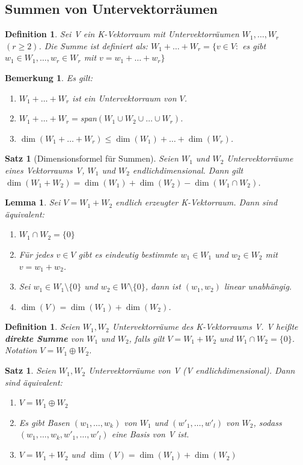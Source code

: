 \documentclass[12pt,a4paper]{article}
\theoremstyle{plain}
\newtheorem{Satz}[Theorem]{Satz}
\newtheorem{Lemma}[Theorem]{Lemma}
\newtheorem{Definition}[Theorem]{Definition}
\newtheorem{Bemerkung}[Theorem]{Bemerkung}
\newcommand{\herv}[1]{{\emph{\textbf{#1}}}}
\numberwithin{equation}{section}
\begin{document}
\subsection{Summen von Untervektorräumen}
\begin{Definition}
Sei V ein K-Vektorraum mit Untervektorräumen $W_1,\ldots,W_r$ $(r\geq 2)$. Die Summe ist definiert als: $W_1+\ldots+W_r=\{v\in V:$ es gibt $w_1\in W_1,\ldots, w_r\in W_r$ mit $v=w_1+\ldots+w_r\}$
\end{Definition}
\begin{Bemerkung}
Es gilt: \begin{enumerate}
\renewcommand{\labelenumi}{\alph{enumi})}
\item $W_1+\ldots+W_r$ ist ein Untervektorraum von $V$.
\item $W_1+\ldots+W_r=$span$(W_1\cup W_2\cup \ldots \cup W_r)$.
\item $\dim(W_1+\ldots+W_r)\leq \dim(W_1)+\ldots+\dim(W_r)$.
\end{enumerate}
\end{Bemerkung}
\begin{Satz}[Dimensionsformel für Summen]
Seien $W_1$ und $W_2$ Untervektorräume eines Vektorraums V, $W_1$ und $W_2$ endlichdimensional. Dann gilt $\dim(W_1+W_2)=\dim(W_1)+\dim(W_2)-\dim(W_1\cap W_2)$.
\end{Satz}
\begin{Lemma}
Sei $V=W_1+W_2$ endlich erzeugter K-Vektorraum. Dann sind äquivalent: \begin{enumerate}
\renewcommand{\labelenumi}{\emph{(\roman{enumi})}}
\item $W_1\cap W_2=\{0\}$
\item Für jedes $v\in V$ gibt es eindeutig bestimmte $w_1\in W_1$ und $w_2\in W_2$ mit $v=w_1+w_2$.
\item Sei $w_1 \in W_1\setminus\{0\}$ und $w_2\in W\setminus\{0\}$, dann ist $(w_1,w_2)$ linear unabhängig.
\item $\dim(V)=\dim(W_1)+\dim(W_2)$.
\end{enumerate}
\end{Lemma}
\begin{Definition}
Seien $W_1, W_2$ Untervektorräume des K-Vektorraums V. V heißte \herv{direkte Summe} von $W_1$ und $W_2$, falls gilt $V=W_1+W_2$ und $W_1\cap W_2=\{0\}$. Notation $V=W_1\oplus W_2$.
\end{Definition}
\begin{Satz}
Seien $W_1, W_2$ Untervektorräume von V (V endlichdimensional). Dann sind äquivalent:
\begin{enumerate}
\renewcommand{\labelenumi}{\emph{(\roman{enumi})}}
\item $V=W_1\oplus W_2$
\item Es gibt Basen $(w_1,\ldots,w_k)$ von $W_1$ und $(w'_1,\ldots,w'_l)$ von $W_2$, sodass $(w_1,\ldots,w_k,w'_1,\ldots,w'_l)$ eine Basis von V ist.
\item $V=W_1+W_2$ und $\dim(V)=\dim(W_1)+\dim(W_2)$
\end{enumerate}
\end{Satz}
\end{document}
